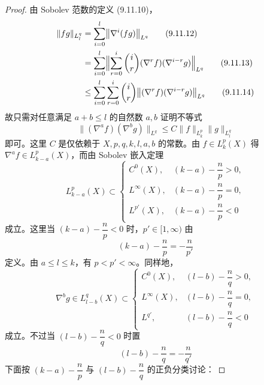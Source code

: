 \begin{proof}
由 Sobolev 范数的定义 (9.11.10)，
\begin{align}
  \|fg\|_{L^q_l} &= \sum_{i=0}^l \bigl\|\nabla^i(fg)\bigr\|_{L^q}
  \tag{9.11.12}\\
  &= \sum_{i=0}^l \Bigl\|\sum_{r=0}^i \binom{i}{r}(\nabla^r f)(\nabla^{i-r}g)\Bigr\|_{L^q}
  \tag{9.11.13}\\
  &\le \sum_{i=0}^l\sum_{r=0}^i \binom{i}{r}
    \bigl\|(\nabla^r f)(\nabla^{i-r}g)\bigr\|_{L^q}
  \tag{9.11.14}
\end{align}
故只需对任意满足 $a+b\le l$ 的自然数 $a,b$ 证明不等式
\begin{equation}
  \bigl\|(\nabla^a f)(\nabla^b g)\bigr\|_{L^q}
  \le C\|f\|_{L^p_k}\|g\|_{L^q_l}
  \tag{9.11.15}
\end{equation}
即可。这里 $C$ 是仅依赖于 $X,p,q,k,l,a,b$ 的常数。由 $f\in L^p_k(X)$ 得 $\nabla^a f\in L^p_{k-a}(X)$，而由 Sobolev 嵌入定理
\begin{equation}
  L^p_{k-a}(X)\subset
  \begin{cases}
    C^0(X), & (k-a)-\dfrac np > 0,\\[1mm]
    L^\infty(X), & (k-a)-\dfrac np = 0,\\[1mm]
    L^{p'}(X), & (k-a)-\dfrac np < 0
  \end{cases}
  \tag{9.11.16}
\end{equation}
成立。这里当 $(k-a)-\dfrac np<0$ 时，$p'\in[1,\infty)$ 由
\begin{equation}
  (k-a)-\frac np = -\frac n{p'}
  \tag{9.11.17}
\end{equation}
定义。由 $a\le l\le k$，有 $p<p'<\infty$。同样地，
\begin{equation}
  \nabla^b g\in L^q_{l-b}(X)\subset
  \begin{cases}
    C^0(X), & (l-b)-\dfrac nq > 0,\\[1mm]
    L^\infty(X), & (l-b)-\dfrac nq = 0,\\[1mm]
    L^{q'}, & (l-b)-\dfrac nq < 0
  \end{cases}
  \tag{9.11.18}
\end{equation}
成立。不过当 $(l-b)-\dfrac nq<0$ 时置
\begin{equation}
  (l-b)-\frac nq = -\frac n{q'}
  \tag{9.11.19}
\end{equation}
下面按 $(k-a)-\dfrac np$ 与 $(l-b)-\dfrac nq$ 的正负分类讨论：


\end{proof}
